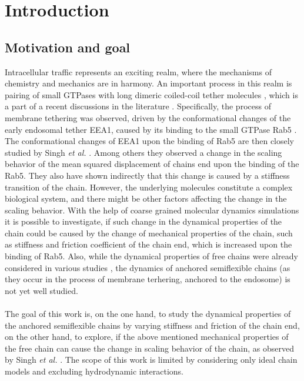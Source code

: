 \documentclass[
    paper=A4,pagesize=automedia,fontsize=12pt,
    BCOR=15mm,DIV=22,
    twoside,headinclude,footinclude=false,
    fleqn,             %
    bibliography=totocnumbered,          %
    listof=totoc,                %
    listof=flat,                 %
    cleardoublepage=empty      %
    numbers=endperiod
]{scrartcl}
\begin{document}
\cleardoublepage

\thispagestyle{empty}
\tableofcontents

\cleardoublepage



\section{Introduction}
\subsection{Motivation and goal}
Intracellular traffic represents an exciting realm, 
where the mechanisms of chemistry and mechanics are in harmony.
An important process in this realm is pairing of 
small GTPases with long dimeric coiled-coil tether molecules \cite{Singh:2022},
which is a part of a recent discussions in the literature \cite{Singh:2022}. 
Specifically, the process of membrane tethering was
observed, driven by the conformational changes of the early endosomal
tether EEA1, caused by its binding to the small GTPase Rab5 \cite{Murray2016}.
The conformational changes of EEA1 upon the binding of Rab5 are then closely
studied by Singh \emph{et al.} \cite{Singh:2022}. 
Among others they observed 
a change in the scaling behavior of the mean squared displacement of 
chains end upon the binding of the Rab5. They also have shown indirectly 
that this change is caused by a stiffness transition of the chain.
However, the underlying molecules constitute a complex biological system, and
there might be other factors affecting the change in the scaling behavior.
With the help of coarse grained molecular dynamics simulations it is possible
to investigate, if such change in the dynamical properties of the chain could 
be caused by the change of mechanical properties of the chain, such as stiffness and 
friction coefficient of the chain end, 
which is increased upon the binding of Rab5. Also, while the dynamical
properties of free chains were already considered in various studies 
\cite{Singh:2022} \cite{Nikoubashman2016} 
\cite{Kremer_ChemPhys} \cite{Hinczewski_2009}, the dynamics of anchored
semiflexible chains
(as they occur in the process of membrane terhering, anchored to the endosome)
is not yet well studied. 
\\
\\
The goal of this work is, on the one hand, to study 
the dynamical properties of the anchored semiflexible chains by varying 
stiffness and 
friction of the chain end, on the other hand, to explore, if the above mentioned
mechanical properties of the free chain can cause the change in scaling behavior
of the chain, as observed by Singh \emph{et al.} \cite{Singh:2022}. The scope
of this work is limited by considering only ideal chain models and excluding
hydrodynamic interactions.
\end{document}

